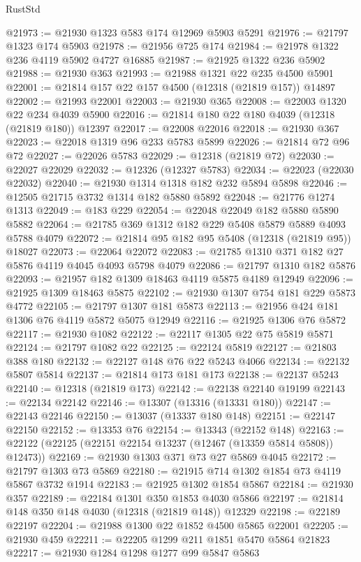 \begin{lexlean}{RustStd}
\begin{coremodule}
@21973 := @21930 @1323 @583 @174 @12969 @5903 @5291
@21976 := @21797 @1323 @174 @5903
@21978 := @21956 @725 @174
@21984 := @21978 @1322 @236 @4119 @5902 @4727 @16885
@21987 := @21925 @1322 @236 @5902
@21988 := @21930 @363
@21993 := @21988 @1321 @22 @235 @4500 @5901
@22001 := @21814 @157 @22 @157 @4500 (@12318 (@21819 @157)) @14897
@22002 := @21993 @22001
@22003 := @21930 @365
@22008 := @22003 @1320 @22 @234 @4039 @5900
@22016 := @21814 @180 @22 @180 @4039 (@12318 (@21819 @180)) @12397
@22017 := @22008 @22016
@22018 := @21930 @367
@22023 := @22018 @1319 @96 @233 @5783 @5899
@22026 := @21814 @72 @96 @72
@22027 := @22026 @5783
@22029 := @12318 (@21819 @72)
@22030 := @22027 @22029
@22032 := @12326 (@12327 @5783)
@22034 := @22023 (@22030 @22032)
@22040 := @21930 @1314 @1318 @182 @232 @5894 @5898
@22046 := @12505 @21715 @3732 @1314 @182 @5880 @5892
@22048 := @21776 @1274 @1313
@22049 := @183 @229
@22054 := @22048 @22049 @182 @5880 @5890 @5882
@22064 := @21785 @369 @1312 @182 @229 @5408 @5879 @5889 @4093 @5788 @4079
@22072 := @21814 @95 @182 @95 @5408 (@12318 (@21819 @95)) @18027
@22073 := @22064 @22072
@22083 := @21785 @1310 @371 @182 @27 @5876 @4119 @4045 @4093 @5798 @4079
@22086 := @21797 @1310 @182 @5876
@22093 := @21957 @182 @1309 @18463 @4119 @5875 @4189 @12949
@22096 := @21925 @1309 @18463 @5875
@22102 := @21930 @1307 @754 @181 @229 @5873 @4772
@22105 := @21797 @1307 @181 @5873
@22113 := @21956 @424 @181 @1306 @76 @4119 @5872 @5075 @12949
@22116 := @21925 @1306 @76 @5872
@22117 := @21930 @1082
@22122 := @22117 @1305 @22 @75 @5819 @5871
@22124 := @21797 @1082 @22
@22125 := @22124 @5819
@22127 := @21803 @388 @180
@22132 := @22127 @148 @76 @22 @5243 @4066
@22134 := @22132 @5807 @5814
@22137 := @21814 @173 @181 @173
@22138 := @22137 @5243
@22140 := @12318 (@21819 @173)
@22142 := @22138 @22140 @19199
@22143 := @22134 @22142
@22146 := @13307 (@13316 (@13331 @180))
@22147 := @22143 @22146
@22150 := @13037 (@13337 @180 @148)
@22151 := @22147 @22150
@22152 := @13353 @76
@22154 := @13343 (@22152 @148)
@22163 := @22122 (@22125 (@22151 @22154 @13237 (@12467 (@13359 @5814 @5808)) @12473))
@22169 := @21930 @1303 @371 @73 @27 @5869 @4045
@22172 := @21797 @1303 @73 @5869
@22180 := @21915 @714 @1302 @1854 @73 @4119 @5867 @3732 @1914
@22183 := @21925 @1302 @1854 @5867
@22184 := @21930 @357
@22189 := @22184 @1301 @350 @1853 @4030 @5866
@22197 := @21814 @148 @350 @148 @4030 (@12318 (@21819 @148)) @12329
@22198 := @22189 @22197
@22204 := @21988 @1300 @22 @1852 @4500 @5865 @22001
@22205 := @21930 @459
@22211 := @22205 @1299 @211 @1851 @5470 @5864 @21823
@22217 := @21930 @1284 @1298 @1277 @99 @5847 @5863

\end{coremodule}
\end{lexlean}
